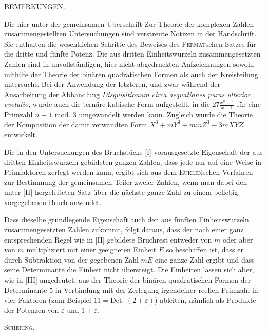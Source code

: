 \clearpage
{}%
\begin{center}BEMERKUNGEN.\end{center}
Die hier unter der gemeinsamen Überschrift Zur Theorie der komplexen Zahlen zusammengestellten Untersuchungen sind verstreute Notizen in der Handschrift. Sie enthalten die wesentlichen Schritte des Beweises des \textsc{Fermat}schen Satzes für die dritte und fünfte Potenz. Die aus dritten Einheitswurzeln zusammengesetzten Zahlen sind in unvollständigen, hier nicht abgedruckten Aufzeichnungen sowohl mithilfe der Theorie der binären quadratischen Formen als auch der Kreisteilung untersucht. Bei der Anwendung der letzteren, und zwar während der Ausarbeitung der Abhandlung \emph{Disquisitionum circa aequationes puras ulterior evolutio}, wurde auch die ternäre kubische Form aufgestellt, in die $27\frac{x^n-1}{x-1}$ für eine Primzahl $n\equiv1\text{ mod. }3$ umgewandelt werden kann. Zugleich wurde die Theorie der Komposition der damit verwandten Form $X^3+mY^3+mmZ^3-3mXYZ$ entwickelt.

Die in den Untersuchungen des Bruchstücks [I] vorausgesetzte Eigenschaft der aus dritten Einheitswurzeln gebildeten ganzen Zahlen, dass jede nur auf eine Weise in Primfaktoren zerlegt werden kann, ergibt sich aus dem \textsc{Euklid}ischen Verfahren zur Bestimmung der gemeinsamen Teiler zweier Zahlen, wenn man dabei den unter [II] hergeleiteten Satz über die nächste ganze Zahl zu einem beliebig vorgegebenen Bruch anwendet.

Dass dieselbe grundlegende Eigenschaft auch den aus fünften Einheitswurzeln zusammengesetzten Zahlen zukommt, folgt daraus, dass der nach einer ganz entsprechenden Regel wie in [II] gebildete Bruchrest entweder von $m$ oder aber von $m$ multipliziert mit einer geeigneten Einheit $E$ so beschaffen ist, dass er durch Subtraktion von der gegebenen Zahl $mE$ eine ganze Zahl ergibt und dass seine Determinante die Einheit nicht übersteigt. Die Einheiten lassen sich aber, wie in [III] angedeutet, aus der Theorie der binären quadratischen Formen der Determinante $5$ in Verbindung mit der Zerlegung irgendeiner reellen Primzahl in vier Faktoren (zum Beispiel $11=\text{Det. }(2+\varepsilon)$) ableiten, nämlich als Produkte der Potenzen von $\varepsilon$ und $1+\varepsilon$.
\begin{flushright}\textsc{Schering.}\end{flushright}
